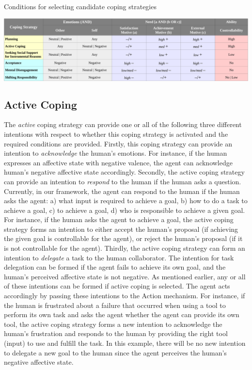 \documentclass[12pt]{report}
\begin{document}
\begin{table}
  \centering
  \caption{Conditions for selecting candidate coping strategies}
  \label{fig:coping_strategies}
  \includegraphics[width=1\textwidth]{figure/coping_algorithms_short_croped.pdf}
\end{table}

\subsection{Active Coping}
\label{sec:active-coping}
The \textit{active} coping strategy can provide one or all of the following
three different intentions with respect to whether this coping strategy is
activated and the required conditions are provided. Firstly, this coping
strategy can provide an intention to \textit{acknowledge} the human's emotions.
For instance, if the human expresses an affective state with negative valence, the agent
can acknowledge human's negative affective state accordingly. Secondly, the active
coping strategy can provide an intention to \textit{respond} to the human if
the human asks a question. Currently, in our framework, the agent can respond to
the human if the human asks the agent: a) what input is required to achieve a
goal, b) how to do a task to achieve a goal, c) to achieve a goal, d) who is
responsible to achieve a given goal. For instance, if the human asks the agent
to achieve a goal, the active coping strategy forms an intention to either
accept the human's proposal (if achieving the given goal is controllable for the
agent), or reject the human's proposal (if it is not controllable for the
agent). Thirdly, the active coping strategy can form an intention to
\textit{delegate} a task to the human collaborator. The intention for task
delegation can be formed if the agent fails to achieve its own goal, and the
human's perceived affective state is not negative. As mentioned earlier, any or all of
these intentions can be formed if active coping is selected. The agent acts
accordingly by passing these intentions to the Action mechanism. For instance,
if the human is frustrated about a failure that occurred when using a tool to
perform its own task and asks the agent whether the agent can provide its own
tool, the active coping strategy forms a new intention to acknowledge the
human's frustration and responds to the human by providing the right tool
(input) to use and fulfill the task. In this example, there will be no new
intention to delegate a new goal to the human since the agent perceives the
human's negative affective state.
\end{document}
